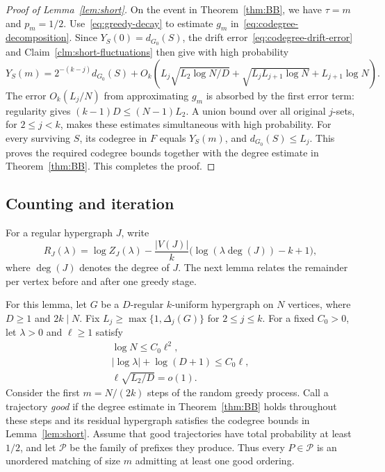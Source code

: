 \documentclass[11pt,reqno]{amsart}
\makeatletter
\numberwithin{equation}{section}
\theoremstyle{plain}
\newenvironment{claimproof}[1][Proof]{\par
    \pushQED{\qed}%
    \renewcommand{\qedsymbol}{$\blacksquare$}
    \normalfont \topsep6\p@\@plus6\p@\relax
    \trivlist
    \item[\hskip\labelsep
    \textit{#1}\@addpunct{.}~]\ignorespaces
}{%
    \popQED\endtrivlist\@endpefalse
}
\theoremstyle{definition}
\makeatother
\begin{document}
\begin{proof}[Proof of Lemma~\ref{lem:short}]
\begin{claimproof}[Proof of Claim~\ref{clm:short-fluctuations}]
    \end{claimproof}

    On the event in Theorem~\ref{thm:BB}, we have $\tau=m$ and $p_m=1/2$.
    Use~\eqref{eq:greedy-decay} to estimate $g_m$ in~\eqref{eq:codegree-decomposition}.
    Since $Y_S(0)=d_{G_0}(S)$, the drift error~\eqref{eq:codegree-drift-error} and Claim~\ref{clm:short-fluctuations} then give with high probability
    \[
        Y_S(m)=2^{-(k-j)}d_{G_0}(S)
        +O_k\left(L_j\sqrt{L_2\log N/D}
        +\sqrt{L_jL_{j+1}\log N}+L_{j+1}\log N\right).
    \]
    The error $O_k(L_j/N)$ from approximating $g_m$ is absorbed by the first error term: regularity gives $(k-1)D\le(N-1)L_2$.
    A union bound over all original $j$-sets, for $2\le j<k$, makes these estimates simultaneous with high probability.
    For every surviving $S$, its codegree in $F$ equals $Y_S(m)$, and $d_{G_0}(S)\le L_j$.
    This proves the required codegree bounds together with the degree estimate in Theorem~\ref{thm:BB}.
    This completes the proof.
\end{proof}


\subsection{Counting and iteration}\label{subsec:greedyiteration}

For a regular hypergraph $J$, write
\[
    R_J(\lambda)=\log Z_J(\lambda)-\frac{|V(J)|}{k}\bigl(\log(\lambda\deg(J))-k+1\bigr),
\]
where $\deg(J)$ denotes the degree of $J$.
The next lemma relates the remainder per vertex before and after one greedy stage.

For this lemma, let $G$ be a $D$-regular $k$-uniform hypergraph on $N$ vertices, where $D\ge1$ and $2k\mid N$.
Fix $L_j\ge\max\{1,\Delta_j(G)\}$ for $2\le j\le k$.
For a fixed $C_0>0$, let $\lambda>0$ and $\ell\ge1$ satisfy
\[
    \begin{gathered}
        \log N\le C_0\ell^2,\\
        |\log\lambda|+\log(D+1)\le C_0\ell,\\
        \ell\sqrt{L_2/D}=o(1).
    \end{gathered}
\]
Consider the first $m=N/(2k)$ steps of the random greedy process.
Call a trajectory \emph{good} if the degree estimate in Theorem~\ref{thm:BB} holds throughout these steps and its residual hypergraph satisfies the codegree bounds in Lemma~\ref{lem:short}.
Assume that good trajectories have total probability at least $1/2$, and let $\mathcal P$ be the family of prefixes they produce.
Thus every $P\in\mathcal P$ is an unordered matching of size $m$ admitting at least one good ordering.
\end{document}
